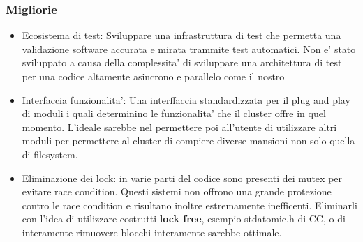 \subsubsection{Migliorie}
\begin{itemize}
    \item Ecosistema di test: Sviluppare una infrastruttura di test che permetta una validazione 
        software accurata e mirata trammite test automatici. Non e' stato sviluppato a causa della
        complessita' di sviluppare una architettura di test per una codice altamente asincrono e
        parallelo come il nostro
    \item Interfaccia funzionalita': Una interffaccia standardizzata per il plug and play di moduli
        i quali determinino le funzionalita' che il cluster offre in quel momento. L'ideale sarebbe
        nel permettere poi all'utente di utilizzare altri moduli per permettere al cluster di 
        compiere diverse mansioni non solo quella di filesystem.
    \item Eliminazione dei lock: in varie parti del codice sono presenti dei mutex per evitare 
        race condition. Questi sistemi non offrono una grande protezione contro le race condition 
        e risultano inoltre estremamente inefficenti. Eliminarli con l'idea di utilizzare 
        costrutti \textbf{lock free}, esempio stdatomic.h di C\/C\+\+, o di interamente rimuovere
        blocchi interamente sarebbe ottimale.
\end{itemize}
